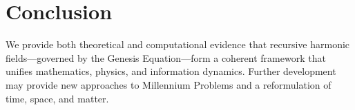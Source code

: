 \documentclass[12pt]{article}
\begin{document}
\section{Conclusion}
We provide both theoretical and computational evidence that recursive harmonic fields—governed by the Genesis Equation—form a coherent framework that unifies mathematics, physics, and information dynamics. Further development may provide new approaches to Millennium Problems and a reformulation of time, space, and matter.
\end{document}

